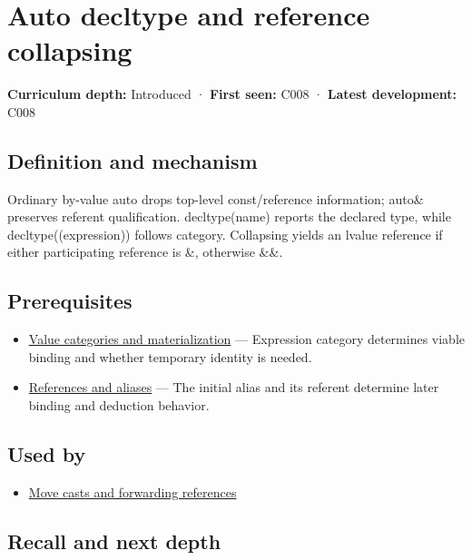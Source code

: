 \hypertarget{appendix-5d4252a42886}{}
\section{Auto decltype and reference collapsing}\label{appendix-5d4252a42886-auto-decltype-and-reference-collapsing}

\textbf{Curriculum depth:} Introduced · \textbf{First seen:} C008 · \textbf{Latest development:} C008

\subsection{Definition and mechanism}\label{appendix-5d4252a42886-definition-and-mechanism}

Ordinary by-value auto drops top-level const/reference information; auto\& preserves referent qualification. decltype(name) reports the declared type, while decltype((expression)) follows category. Collapsing yields an lvalue reference if either participating reference is \&, otherwise \&\&.

\subsection{Prerequisites}\label{appendix-5d4252a42886-prerequisites}

\begin{itemize}
\tightlist
\item
  \hyperref[appendix-1121b30eaeb0]{Value categories and materialization} --- Expression category determines viable binding and whether temporary identity is needed.
\item
  \hyperref[appendix-d6d562ca9fbb]{References and aliases} --- The initial alias and its referent determine later binding and deduction behavior.
\end{itemize}

\subsection{Used by}\label{appendix-5d4252a42886-used-by}

\begin{itemize}
\tightlist
\item
  \hyperref[appendix-0104b704fb11]{Move casts and forwarding references}
\end{itemize}

\subsection{Recall and next depth}\label{appendix-5d4252a42886-recall-and-next-depth}

